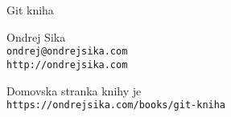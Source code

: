 \maketitle

\newpage

$$$$

\vfill

{\LARGE Git kniha}
\vspace{0.3cm}

{\large Ondrej Sika}\\
\texttt{ondrej@ondrejsika.com}\\
\texttt{http://ondrejsika.com}
\vspace{0.8cm}

Domovska stranka knihy je\\
\texttt{https://ondrejsika.com/books/git-kniha}

\newpage

$$$$

\tableofcontents

